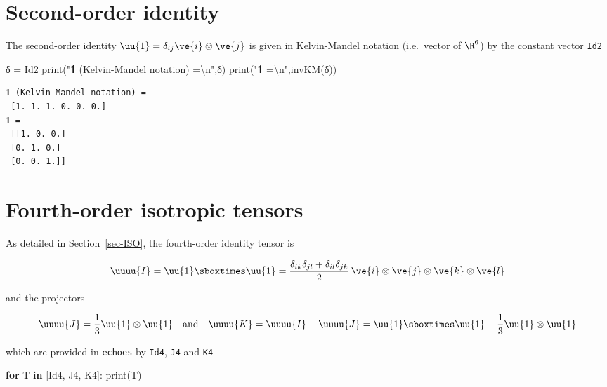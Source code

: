 \documentclass[
  letterpaper,
  DIV=11,
  numbers=noendperiod]{scrreprt}
\newenvironment{Shaded}{\begin{snugshade}}{\end{snugshade}}
\newcommand{\BuiltInTok}[1]{\textcolor[rgb]{0.00,0.23,0.31}{#1}}
\newcommand{\CharTok}[1]{\textcolor[rgb]{0.13,0.47,0.30}{#1}}
\newcommand{\ControlFlowTok}[1]{\textcolor[rgb]{0.00,0.23,0.31}{\textbf{#1}}}
\newcommand{\KeywordTok}[1]{\textcolor[rgb]{0.00,0.23,0.31}{\textbf{#1}}}
\newcommand{\NormalTok}[1]{\textcolor[rgb]{0.00,0.23,0.31}{#1}}
\newcommand{\OperatorTok}[1]{\textcolor[rgb]{0.37,0.37,0.37}{#1}}
\newcommand{\StringTok}[1]{\textcolor[rgb]{0.13,0.47,0.30}{#1}}
\begin{document}
\section{Second-order identity}\label{second-order-identity}

The second-order identity \(\uu{1}=\delta_{ij}\ve{i}\otimes\ve{j}\) is
given in Kelvin-Mandel notation (i.e.~vector of \(\R^6\)) by the
constant vector \texttt{Id2}

\begin{Shaded}
\begin{Highlighting}[]
\NormalTok{δ }\OperatorTok{=}\NormalTok{ Id2}
\BuiltInTok{print}\NormalTok{(}\StringTok{"𝟏 (Kelvin{-}Mandel notation) =}\CharTok{\textbackslash{}n}\StringTok{"}\NormalTok{,δ)}
\BuiltInTok{print}\NormalTok{(}\StringTok{"𝟏 =}\CharTok{\textbackslash{}n}\StringTok{"}\NormalTok{,invKM(δ))}
\end{Highlighting}
\end{Shaded}

\begin{verbatim}
𝟏 (Kelvin-Mandel notation) =
 [1. 1. 1. 0. 0. 0.]
𝟏 =
 [[1. 0. 0.]
 [0. 1. 0.]
 [0. 0. 1.]]
\end{verbatim}

\section{Fourth-order isotropic
tensors}\label{fourth-order-isotropic-tensors}

As detailed in Section~\ref{sec-ISO}, the fourth-order identity tensor
is

\[
\uuuu{I}=\uu{1}\sboxtimes\uu{1}=
\frac{\delta_{ik}\delta_{jl}+\delta_{il}\delta_{jk}}{2}\,\ve{i}\otimes\ve{j}\otimes\ve{k}\otimes\ve{l}
\]

and the projectors

\[
\uuuu{J}=\frac{1}{3}\uu{1}\otimes\uu{1}
\quad \textrm{and} \quad
\uuuu{K}=\uuuu{I}-\uuuu{J}=\uu{1}\sboxtimes\uu{1}-\frac{1}{3}\uu{1}\otimes\uu{1}
\]

which are provided in \texttt{echoes} by \texttt{Id4}, \texttt{J4} and
\texttt{K4}

\begin{Shaded}
\begin{Highlighting}[]
\ControlFlowTok{for}\NormalTok{ T }\KeywordTok{in}\NormalTok{ [Id4, J4, K4]:}
    \BuiltInTok{print}\NormalTok{(T)}
\end{Highlighting}
\end{Shaded}
\end{document}
